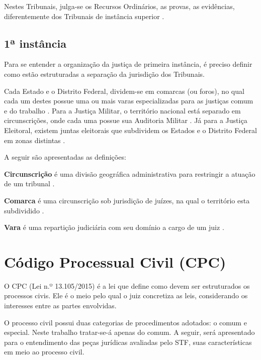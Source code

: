 Nestes Tribunais, julga-se os Recursos Ordinários, as provas, as evidências, diferentemente dos Tribunais de instância superior \cite{JUNIOR2012}.

\subsection{1ª instância}

Para se entender a organização da justiça de primeira instância, é preciso definir como estão estruturadas a separação da jurisdição dos Tribunais.

Cada Estado e o Distrito Federal, dividem-se em comarcas (ou foros), no qual cada um destes possue uma ou mais varas especializadas  para as justiças comum e do trabalho \cite{JUNIOR2012}. Para a Justiça Militar, o território nacional está separado em circunscrições, onde cada uma possue sua Auditoria Militar \cite{BRASIL1992}. Já para a Justiça Eleitoral, existem juntas eleitorais que subdividem os Estados e o Distrito Federal em zonas distintas \cite{BRASIL1988}.

A seguir são apresentadas as definições:

\begin{description}
	\item \textbf{Circunscrição} é uma divisão geográfica administrativa para restringir a atuação de um tribunal \cite[p. 71]{GUIMARAES2012}.
	\item \textbf{Comarca} é uma circunscrição sob jurisdição de juízes, na qual o território esta subdividido \cite[p. 75]{GUIMARAES2012}.
    \item \textbf{Vara} é uma repartição judiciária com seu domínio a cargo de um juiz \cite[p. 259]{GUIMARAES2012}.
\end{description}


\section{Código Processual Civil (CPC)}
\label{sec:cpc}

O CPC (Lei n.º 13.105/2015) é a lei que define como devem ser estruturados os processos civis. Ele é o meio pelo qual o juiz concretiza as leis, considerando os interesses entre as partes envolvidas.

O processo civil possui duas categorias de procedimentos adotados: o comum e especial. Neste trabalho tratar-se-á apenas do comum. A seguir, será apresentado para o entendimento das peças jurídicas avaliadas pelo STF, suas características em meio ao processo civil.

